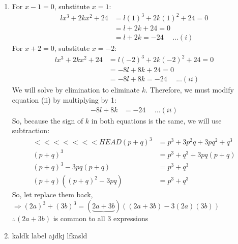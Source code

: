 \begin{multicols}{2}
\begin{enumerate}[label={\textbf{\arabic*.}}]
\item For \( x - 1 = 0 \), substitute \( x = 1 \):
  \begin{align*}
    lx^3 + 2kx^2 + 24 &= l(1)^3 + 2k(1)^2 + 24 = 0 \\
    &= l + 2k + 24 = 0 \\
    &= l + 2k = -24 \hspace{15pt}...(i)
  \end{align*}
  For \( x + 2 = 0 \), substitute \( x = -2 \):
  \begin{align*}
    lx^3 + 2kx^2 + 24 &= l(-2)^3 + 2k(-2)^2 + 24 = 0 \\
    &= -8l + 8k + 24 = 0 \\
    &= -8l + 8k = -24 \hspace{15pt}...(ii)
  \end{align*}
  We will solve by elimination to eliminate \( k \). Therefore, we must modify equation (ii) by multiplying by 1:
  \begin{align*}
    -8l + 8k &= -24 \hspace{15pt}...(ii)
  \end{align*}
  So, because the sign of \( k \) in both equations is the same, we will use subtraction:
  \begin{align*}
    <<<<<<< HEAD
    (p + q)^3 &= p^3 + 3p^2q + 3pq^2 + q^3 \\
    (p + q)^3 &= p^3 + q^3 + 3pq(p + q)  \\
    (p + q)^3 - 3pq(p + q) & = p^3 + q^3 \\
    (p+q)((p+q)^2 - 3pq) &= p^3 + q^3
  \end{align*}
  So, let replace them back, \\
  $ \Rightarrow (2a)^3 + (3b)^3 =(\underbrace{2a + 3b})\left((2a + 3b) - 3(2a)(3b)\right) $ \\
  $\therefore (2a + 3b)$ is common to all 3 expressions
\item kaldk label
  ajdkj lfkasld


\end{enumerate}
\end{multicols}
